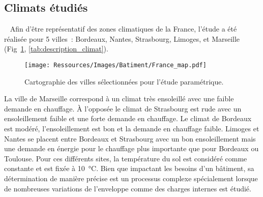 \subsection{Climats étudiés} %
\label{sub:climats_etudies}
~
Afin d’être représentatif des zones climatiques de la France, l’étude a été réalisée
pour 5 villes~: Bordeaux, Nantes, Strasbourg, Limoges, et Marseille (Fig~\ref{fig:carte_france},
\autoref{tab:description_climat}).
\begin{figure}
    \begin{center}
        \texttt{[image: Ressources/Images/Batiment/France\_map.pdf]}
    \end{center}
    \caption{Cartographie des villes sélectionnées pour l’étude paramétrique.
             \label{fig:carte_france}}
\end{figure}
La ville de Marseille correspond à un climat très ensoleillé avec une faible demande
en chauffage. À l’opposée le climat de Strasbourg est rude avec un ensoleillement faible
et une forte demande en chauffage. Le climat de Bordeaux est modéré, l’ensoleillement
est bon et la demande en chauffage faible. Limoges et Nantes se placent entre Bordeaux et Strasbourg
avec un bon ensoleillement mais une demande en énergie pour le chauffage plus importante
que pour Bordeaux ou Toulouse.
Pour ces différents sites, la température du sol est considéré comme constante et
est fixée à \SI{10}{\celsius}. Bien que impactant les besoins
d’un bâtiment, sa détermination de manière précise est un processus complexe
spécialement lorsque de nombreuses variations de l’enveloppe comme des charges internes
est étudié.

